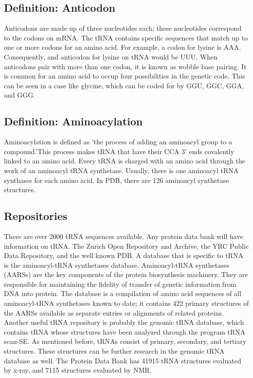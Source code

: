\documentclass[pdftex, 12pt]{article}
\begin{document}
\subsection{Definition:  Anticodon} Anticodons  are made  up  of three
nucleotides  each;  these  nucleotides  correspond to  the  codons  on
mRNA. The  tRNA contains  specific sequences that  match up to  one or
more codons  for an  amino acid.  For example, a  codon for  lysine is
AAA. Consequently, and anticodon for lysine on tRNA would be UUU. When
anticodons pair with  more than one codon, it is  known as wobble base
pairing. It is common for an amino acid to occup four possibilities in
the genetic code.  This can be seen in a case  like glycine, which can
be coded for by GGU, GGC, GGA, and GGG.

\subsection{Definition:  Aminoacylation} Aminoacylation is  defined as
'the process of adding an  aminoacyl group to a compound.'This process
makes tRNA that  have their CCA 3' ends covalently  linked to an amino
acid. Every tRNA is charged with  an amino acid through the work of an
aminoacyl  tRNA  synthetase.  Usually,  there is  one  aminoacyl  tRNA
synthases  for  each amino  acid.  In  PDB,  there are  126  aminoacyl
synthetase structures.

\subsection{Repositories}   There  are   over   2000  tRNA   sequences
available. Any  protein data bank  will have information on  tRNA. The
Zurich Open  Repository and Archive,  the YRC Public  Data Repository,
and the  well known PDB.  A database that  is specific to tRNA  is the
aminoacyl-tRNA   synthetases   database.  Aminoacyl-tRNA   synthetases
(AARSs)   are  the   key  components   of  the   protein  biosynthesis
machinery.  They  are  responsible  for maintaining  the  fidelity  of
transfer of genetic information from DNA into protein. The database is
a  compilation   of  amino   acid  sequences  of   all  aminoacyl-tRNA
synthetases known to  date; it contains 422 primary  structures of the
AARSs available as separate entries or alignments of related proteins.
Another useful tRNA repository  is probably the genomic tRNA database,
which contains  tRNA whose structures  have been analyzed  through the
program tRNA  scan-SE. As mentioned before, tRNAs  consist of primary,
secondary, and  tertiary structures.  These structures can  be further
research in the genomic tRNA  database as well.  The Protein Data Bank
has  41915 tRNA  structures evaluated  by x-ray,  and  7115 structures
evaluated by NMR.
\end{document}
